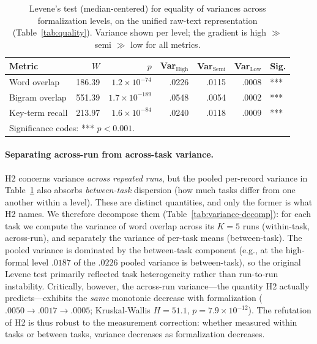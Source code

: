\documentclass[runningheads]{llncs}
\begin{document}
\begin{table}[ht]
\centering
\caption{Levene's test (median-centered) for equality of variances across formalization levels, on the unified raw-text representation (Table~\ref{tab:quality}). Variance shown per level; the gradient is high $\gg$ semi $\gg$ low for all metrics.}
\label{tab:levene}
\setlength{\tabcolsep}{6pt}
\begin{tabular}{lrrrrrl}
\toprule
Metric & $W$ & $p$ & Var$_{\text{High}}$ & Var$_{\text{Semi}}$ & Var$_{\text{Low}}$ & Sig. \\
\midrule
Word overlap    & 186.39 & $1.2 \times 10^{-74}$  & .0226 & .0115 & .0008 & *** \\
Bigram overlap  & 551.39 & $1.7 \times 10^{-189}$ & .0548 & .0054 & .0002 & *** \\
Key-term recall & 213.97 & $1.6 \times 10^{-84}$  & .0240 & .0118 & .0009 & *** \\
\bottomrule
\multicolumn{4}{l}{\scriptsize Significance codes: *** $p < 0.001$.}
\end{tabular}
\end{table}

\paragraph{Separating across-run from across-task variance.}
H2 concerns variance \emph{across repeated runs}, but the pooled per-record variance in Table~\ref{tab:levene} also absorbs \emph{between-task} dispersion (how much tasks differ from one another within a level). These are distinct quantities, and only the former is what H2 names. We therefore decompose them (Table~\ref{tab:variance-decomp}): for each task we compute the variance of word overlap across its $K\!=\!5$ runs (within-task, across-run), and separately the variance of per-task means (between-task). The pooled variance is dominated by the between-task component (e.g., at the high-formal level $.0187$ of the $.0226$ pooled variance is between-task), so the original Levene test primarily reflected task heterogeneity rather than run-to-run instability. Critically, however, the across-run variance---the quantity H2 actually predicts---exhibits the \emph{same} monotonic decrease with formalization ($.0050 \to .0017 \to .0005$; Kruskal-Wallis $H\!=\!51.1$, $p\!=\!7.9\times10^{-12}$). The refutation of H2 is thus robust to the measurement correction: whether measured within tasks or between tasks, variance decreases as formalization decreases.
\end{document}
